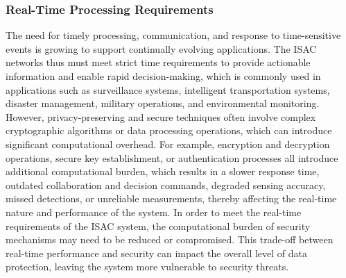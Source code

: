 \documentclass[10pt,journal,twocolumn,twoside]{IEEEtran} %
\begin{document}
\subsubsection{Real-Time Processing Requirements}
The need for timely processing, communication, and response to time-sensitive events is growing to support continually evolving applications. The ISAC networks thus must meet strict time requirements to provide actionable information and enable rapid decision-making, which is commonly used in applications such as surveillance systems, intelligent transportation systems, disaster management, military operations, and environmental monitoring. However, privacy-preserving and secure techniques often involve complex cryptographic algorithms or data processing operations, which can introduce significant computational overhead. For example, encryption and decryption operations, secure key establishment, or authentication processes all introduce additional computational burden, which results in a slower response time, outdated collaboration and decision commands, degraded sensing accuracy, missed detections, or unreliable measurements, thereby affecting the real-time nature and performance of the system. In order to meet the real-time requirements of the ISAC system, the computational burden of security mechanisms may need to be reduced or compromised. This trade-off between real-time performance and security can impact the overall level of data protection, leaving the system more vulnerable to security threats.

\end{document}
